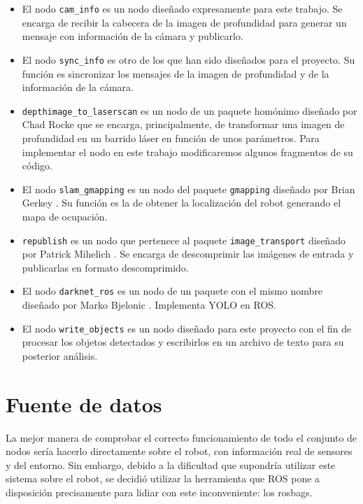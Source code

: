 \begin{itemize}

	\item El nodo \texttt{cam\_info} es un nodo diseñado expresamente para este trabajo. Se encarga de recibir la cabecera de la imagen de profundidad para generar un mensaje con información de la cámara y publicarlo.
	\item El nodo \texttt{sync\_info} es otro de los que han sido diseñados para el proyecto. Su función es sincronizar los mensajes de la imagen de profundidad y de la información de la cámara.
	\item \texttt{depthimage\_to\_laserscan} es un nodo de un paquete homónimo diseñado por Chad Rocke \cite{di2ls} que se encarga, principalmente, de transformar una imagen de profundidad en un barrido láser en función de unos parámetros. Para implementar el nodo en este trabajo modificaremos algunos fragmentos de su código.
	\item El nodo \texttt{slam\_gmapping} es un nodo del paquete \texttt{gmapping} diseñado por Brian Gerkey \cite{gmapping}. Su función es la de obtener la localización del robot generando el mapa de ocupación.
	\item \texttt{republish} es un nodo que pertenece al paquete \texttt{image\_transport} diseñado por Patrick Mihelich \cite{republish}. Se encarga de descomprimir las imágenes de entrada y publicarlas en formato descomprimido.
	\item El nodo \texttt{darknet\_ros} es un nodo de un paquete con el mismo nombre diseñado por Marko Bjelonic \cite{darknet}. Implementa YOLO en ROS.
	\item El nodo \texttt{write\_objects} es un nodo diseñado para este proyecto con el fin de procesar los objetos detectados y escribirlos en un archivo de texto para su posterior análisis.
	

\end{itemize}


\section{Fuente de datos} \label{sec:datos}

La mejor manera de comprobar el correcto funcionamiento de todo el conjunto de nodos sería hacerlo directamente sobre el robot, con información real de sensores y del entorno. Sin embargo, debido a la dificultad que supondría utilizar este sistema sobre el robot, se decidió utilizar la herramienta que ROS pone a disposición precisamente para lidiar con este inconveniente: los rosbags.\\

